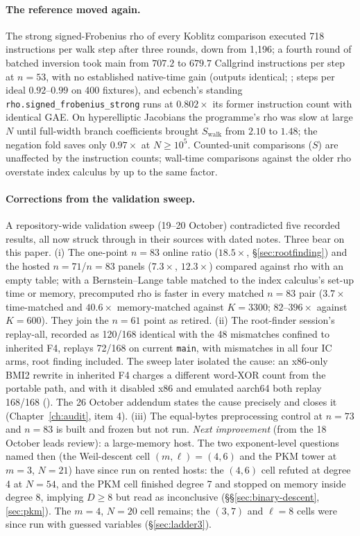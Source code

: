 \paragraph{The reference moved again.} The strong signed-Frobenius rho of
every Koblitz comparison executed 718 instructions per walk step after
three rounds, down from 1{,}196; a fourth round of batched inversion took
main from $707.2$ to $679.7$ Callgrind instructions per step at $n=53$, with
no established native-time gain (outputs identical;
; steps per ideal
$0.92$--$0.99$ on 400 fixtures), and ecbench's standing
\texttt{rho.signed\_frobenius\_strong} runs at $0.802\times$ its former
instruction count with identical GAE. On hyperelliptic Jacobians the
programme's rho was slow at large $N$ until full-width branch coefficients
brought $S_\text{walk}$ from $2.10$ to $1.48$; the negation fold saves only
$0.97\times$ at $N\ge10^5$. Counted-unit comparisons ($S$) are unaffected
by the instruction counts; wall-time comparisons against the older rho
overstate index calculus by up to the same factor.

\paragraph{Corrections from the validation sweep.} A repository-wide
validation sweep (19--20 October) contradicted five recorded results, all
now struck through in their sources with dated notes. Three bear on this
paper. (i) The one-point $n=83$ online ratio ($18.5\times$,
\S\ref{sec:rootfinding}) and the hosted $n=71$/$n=83$ panels ($7.3\times$,
$12.3\times$) compared against rho with an empty table; with a
Bernstein--Lange table matched to the index calculus's set-up time or
memory, precomputed rho is faster in every matched $n=83$ pair
($3.7\times$ time-matched and $40.6\times$ memory-matched against $K=3300$;
$82$--$396\times$ against $K=600$). They join the $n=61$ point as retired.
(ii) The root-finder session's replay-all, recorded as 120/168 identical with
the 48 mismatches confined to inherited F4, replays 72/168 on current
\texttt{main}, with mismatches in all four IC arms, root finding included.
The sweep later isolated the cause: an x86-only BMI2 rewrite in inherited F4
charges a different word-XOR count from the portable path, and with it
disabled x86 and emulated aarch64 both replay 168/168
().
The 26 October addendum states the cause precisely and closes it
(Chapter~\ref{ch:audit}, item 4). (iii) The equal-bytes preprocessing control at
$n=73$ and $n=83$ is built and frozen but not run.
\emph{Next improvement} (from the 18 October leads review): a large-memory
host. The two exponent-level questions named then (the Weil-descent cell
$(m,\ell)=(4,6)$ and the PKM tower at $m=3$, $N=21$) have since run on
rented hosts: the $(4,6)$ cell refuted at degree 4 at $N=54$, and the PKM
cell finished degree 7 and stopped on memory inside degree 8, implying
$D\ge8$ but read as inconclusive (\S\S\ref{sec:binary-descent},\ref{sec:pkm}).
The $m=4$, $N=20$ cell remains; the $(3,7)$ and $\ell=8$ cells were since
run with guessed variables (\S\ref{sec:ladder3}).

